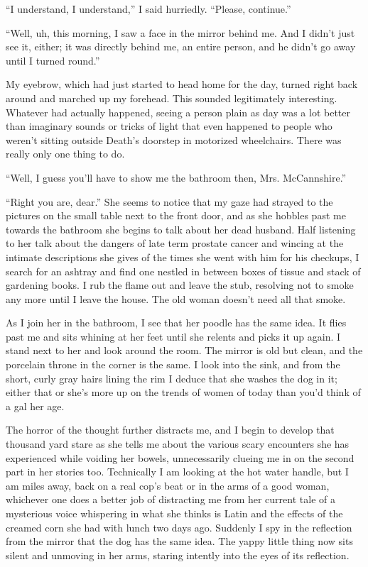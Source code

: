 ``I understand, I understand,'' I said hurriedly. ``Please,
continue.''



``Well, uh, this morning, I saw a face in the mirror behind me. And
I didn't just see it, either; it was directly behind me, an entire
person, and he didn't go away until I turned round.''



My eyebrow, which had just started to head home for the day, turned
right back around and marched up my forehead. This sounded
legitimately interesting. Whatever had actually happened, seeing a
person plain as day was a lot better than imaginary sounds or
tricks of light that even happened to people who weren't sitting
outside Death's doorstep in motorized wheelchairs. There was really
only one thing to do.



``Well, I guess you'll have to show me the bathroom then, Mrs.
McCannshire.''



``Right you are, dear.'' She seems to notice that my gaze had strayed
to the pictures on the small table next to the front door, and as
she hobbles past me towards the bathroom she begins to talk about
her dead husband. Half listening to her talk about the dangers of
late term prostate cancer and wincing at the intimate descriptions
she gives of the times she went with him for his checkups, I search
for an ashtray and find one nestled in between boxes of tissue and
stack of gardening books. I rub the flame out and leave the stub,
resolving not to smoke any more until I leave the house. The old
woman doesn't need all that smoke.



As I join her in the bathroom, I see that her poodle has the same
idea. It flies past me and sits whining at her feet until she
relents and picks it up again. I stand next to her and look around
the room. The mirror is old but clean, and the porcelain throne in
the corner is the same. I look into the sink, and from the short,
curly gray hairs lining the rim I deduce that she washes the dog in
it; either that or she's more up on the trends of women of today
than you'd think of a gal her age.



The horror of the thought further distracts me, and I begin to
develop that thousand yard stare as she tells me about the various
scary encounters she has experienced while voiding her bowels,
unnecessarily clueing me in on the second part in her stories too.
Technically I am looking at the hot water handle, but I am miles
away, back on a real cop's beat or in the arms of a good woman,
whichever one does a better job of distracting me from her current
tale of a mysterious voice whispering in what she thinks is Latin
and the effects of the creamed corn she had with lunch two days
ago. Suddenly I spy in the reflection from the mirror that the dog
has the same idea. The yappy little thing now sits silent and
unmoving in her arms, staring intently into the eyes of its
reflection.




